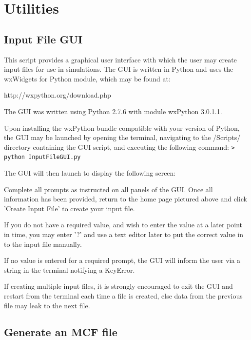 \chapter{Utilities}

\section{Input File GUI} \label{Sec:GUI}

This script provides a graphical user interface with which the user 
may create input files for use in simulations.  The GUI is written 
in Python and uses the wxWidgets for Python module, which may be found at:   

http://wxpython.org/download.php

The GUI was written using Python 2.7.6 with module wxPython 3.0.1.1.

Upon installing the wxPython bundle compatible with your version of 
Python, the GUI may be launched by opening
the terminal, navigating to the /Scripts/ directory containing the GUI script, 
and executing the following command: 
%
\texttt{> python InputFileGUI.py}
%

The GUI will then launch to display the following screen:


Complete all prompts as instructed on all panels of the GUI. 
Once all information has been provided, return to the home page pictured 
above and click 'Create Input File' to create your input file.

If you do not have a required value, and wish to enter the value at a later 
point in time, you may enter '?' and use a text editor later to put the 
correct value in to the input file manually.  

If no value is entered for a required prompt, the GUI will inform the user 
via a string in the terminal notifying a KeyError.

If creating multiple input files, it is strongly encouraged to exit the GUI
and restart from the terminal each time a file is created, else data from the 
previous file may leak to the next file.



\section{Generate an MCF file}
\label{sec:mcfgen}

